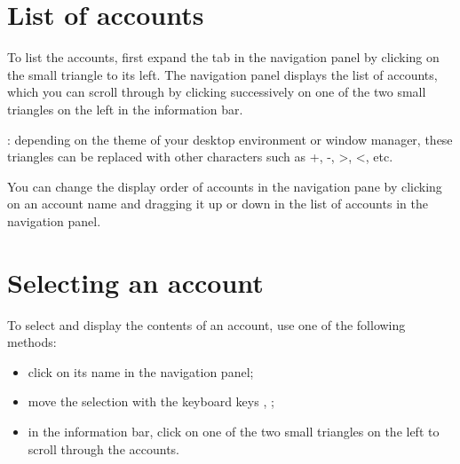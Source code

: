 \section{List of accounts\label{accounts-list}}%


To list the accounts, first expand the  tab in the navigation panel by clicking on the small triangle to its left. The navigation panel displays the list of accounts, which you can scroll through by clicking successively on one of the two small triangles on the left in the information bar.

\Note{}: depending on the theme of your desktop environment or window manager, these triangles can be replaced with other characters such as +, -, >, <, etc.


You can change the display order of accounts in the navigation pane by clicking on an account name and dragging it up or down in the list of accounts in the navigation panel.


\section{Selecting an account\label{accounts-selection}}%


To select and display the contents of an account, use one of the following methods:

\begin{itemize}
	\item click on its name in the navigation panel;
	\item move the selection with the keyboard keys \keys{\arrowkeyup}, \keys{\arrowkeydown};
	\item in the information bar, click on one of the two small triangles on the left to scroll through the accounts.
\end{itemize}


